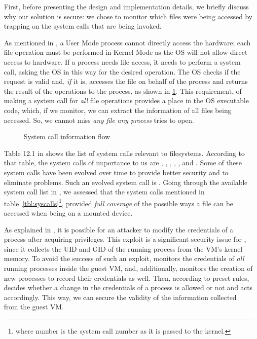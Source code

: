 \par First, before presenting the design and implementation details, we briefly discuss why our solution is secure: we chose to monitor which files were being accessed by trapping on the system calls that are being invoked. 

\par As mentioned in \cite{linuxkernel}, a User Mode process cannot directly access the hardware; each file operation must be performed in Kernel Mode as the \ac{OS} will not allow direct access to hardware. If a process needs file access, it needs to perform a system call, asking the \ac{OS} in this way for the desired operation. The \ac{OS} checks if the request is valid and, \emph{if} it is, accesses the file on behalf of the process and returns the result of the operations to the process, as shown in \ref{fig:syscall}. This requirement, of making a system call for \emph{all} file operations provides a place in the \ac{OS} executable code, which, if we monitor, we can extract the information of all files being accessed. So, we cannot miss \emph{any file any process} tries to open.

\begin{figure}[ht]
	\centering
	
	\caption{System call information flow}
	\label{fig:syscall}
\end{figure}

\par Table 12.1 in \cite{linuxkernel} shows the list of system calls relevant to filesystems. According to that table, the system calls of importance to us are , , , , , and . Some of these system calls have been evolved over time to provide better security and to eliminate problems. Such an evolved system call is . Going through the available system call list in , we assessed that the system calls mentioned in table~\ref{tbl:syscalls}\footnote{where number is the system call number as it is passed to the kernel.}, provided \emph{full coverage} of the possible ways a file can be accessed when being on a mounted device. 

\par As explained in \cite{perla2010guide}, it is possible for an attacker to modify the credentials of a process after acquiring  privileges. This exploit is a significant security issue for , since it collects the \ac{UID} and \ac{GID} of the running process from the \ac{VM}'s kernel memory. To avoid the success of such an exploit,  monitors the credentials of \emph{all} running processes inside the guest \ac{VM}, and, additionally, monitors the creation of new processes to record their credentials as well. Then, according to preset rules,  decides whether a change in the credentials of a process is allowed or not and acts accordingly. This way, we can secure the validity of the information collected from the guest \ac{VM}.



